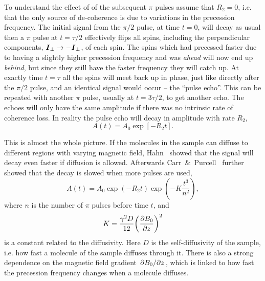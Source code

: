 \documentclass[11pt,a4paper, twocolumn,
swedish, english %
]{article}
\begin{document}
To understand the effect of of the subsequent $\pi$ pulses assume that
$R_2=0$, i.e. that the only source of de-coherence is due to
variations in the precession frequency. The initial signal from the
$\pi/2$ pulse, at time $t=0$, will decay as usual then a $\pi$ pulse
at $t=\tau/2$ effectively flips all spins, including the
perpendicular components, $\vb*I_\perp\to-\vb*I_\perp$, of each
spin. The spins which had precessed faster due to having a slightly
higher precession frequency and was \emph{ahead} will now end up
\emph{behind}, but since they still have the faster frequency they
will catch up. At exactly time $t=\tau$ all the spins will meet
back up in phase, just like directly after the $\pi/2$ pulse, and an
identical signal would occur -- the ``pulse echo''. This can be
repeated with another $\pi$ pulse, usually at $t=3\tau/2$, to get
another echo. The echoes will only have the same amplitude if there
was no intrinsic rate of coherence loss. In reality the pulse echo
will decay in amplitude with rate $R_2$,
\begin{equation}
A(t)=A_0\exp[-R_2t].
\end{equation}

This is almost the whole picture. If the molecules in the sample can
diffuse to different regions with varying magnetic field,
Hahn~\cite{Hahn1950} showed that the signal will decay even faster if
diffusion is allowed. Afterwards
Carr~\&~Purcell~\cite{Carr-Purcell1954} further showed that the decay
is slowed when more pulses are used,
\begin{equation}\label{eq:echo-diffusion}
A(t)=A_0\exp(-R_2t)
\exp(-K\frac{t^3}{n^2}),
\end{equation}
where $n$ is the number of $\pi$ pulses before time $t$, and 
\begin{equation}\label{eq:K_simple}
K=\frac{\gamma^2D}{12}\qty(\pdv{B_0}{z})^2
\end{equation}
is a constant related to the diffusivity. Here $D$ is the
self-diffusivity of the sample, i.e. how fast a molecule of the sample
diffuses through it. There is also a strong dependence on the magnetic
field gradient $\pdv*{B_0}{z}$, which is linked to how fast the
precession frequency changes when a molecule diffuses.
\end{document}
